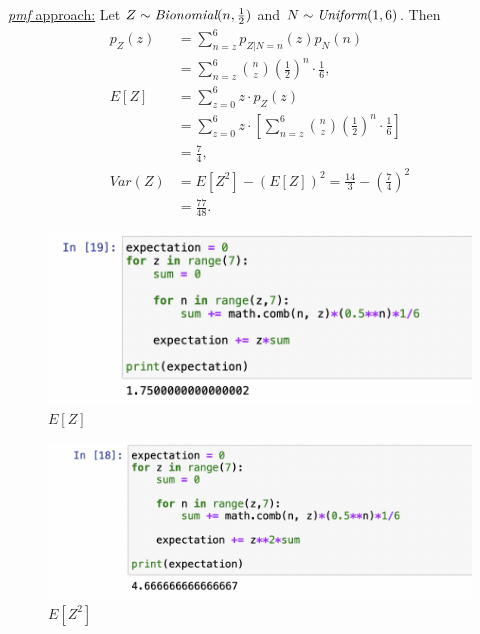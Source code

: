\documentclass{article}
\begin{document}
\underline{\emph{pmf} approach:} Let $Z \sim \emph{Bionomial}(n,\frac{1}{2})$ and $N \sim \emph{Uniform}(1,6)$. 
Then 
\begin{align}
    p_Z(z) & = \sum\limits_{n=z}^6p_{Z|N=n}(z)p_N(n) \nonumber \\
    & = \sum\limits_{n=z}^6{n \choose z}\left(\frac{1}{2}\right)^n\cdot \frac{1}{6}, \nonumber \\
    E[Z] & =\sum\limits_{z=0}^6z\cdot p_Z(z) \nonumber \\
    & = \sum\limits_{z=0}^6z\cdot \left[\sum\limits_{n=z}^6{n \choose z}\left(\frac{1}{2}\right)^n\cdot \frac{1}{6}\right] \nonumber \\
    & = \frac{7}{4}, \nonumber \\
    Var(Z) & = E[Z^2] - (E[Z])^2 = \frac{14}{3} - \left(\frac{7}{4}\right)^2 \nonumber \\
    & = \frac{77}{48}. \nonumber
\end{align}
\begin{figure}[htb]
    \qquad
    \begin{minipage}{.4\textwidth}
        \centering
        {\includegraphics[scale=0.4]{E[Z].png}}
        \qquad\qquad$E[Z]$\label{fig:1}
    \end{minipage}    
    \qquad
    \begin{minipage}{.4\textwidth}
        \centering
        {\includegraphics[scale=0.4]{E[Z^2].png}}
        \qquad\qquad$E[Z^2]$\label{fig:2}
    \end{minipage}        
\end{figure} 
\bigbreak
\end{document}
